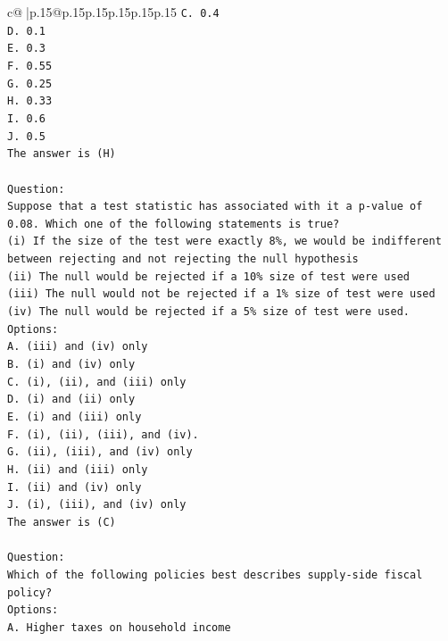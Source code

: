 \documentclass{article}
\begin{document}
{\begin{supertabular}{c@{$\;$}|p{.15\linewidth}@{}p{.15\linewidth}p{.15\linewidth}p{.15\linewidth}p{.15\linewidth}p{.15\linewidth}}
{{{\texttt{C. 0.4} \\
\texttt{D. 0.1} \\
\texttt{E. 0.3} \\
\texttt{F. 0.55} \\
\texttt{G. 0.25} \\
\texttt{H. 0.33} \\
\texttt{I. 0.6} \\
\texttt{J. 0.5} \\
\texttt{The answer is (H)} \\
\\ 
\texttt{Question:} \\
\texttt{Suppose that a test statistic has associated with it a p{-}value of 0.08. Which one of the following statements is true?} \\
\texttt{(i) If the size of the test were exactly 8\%, we would be indifferent between rejecting and not rejecting the null hypothesis} \\
\texttt{(ii) The null would be rejected if a 10\% size of test were used} \\
\texttt{(iii) The null would not be rejected if a 1\% size of test were used} \\
\texttt{(iv) The null would be rejected if a 5\% size of test were used.} \\
\texttt{Options:} \\
\texttt{A. (iii) and (iv) only} \\
\texttt{B. (i) and (iv) only} \\
\texttt{C. (i), (ii), and (iii) only} \\
\texttt{D. (i) and (ii) only} \\
\texttt{E. (i) and (iii) only} \\
\texttt{F. (i), (ii), (iii), and (iv).} \\
\texttt{G. (ii), (iii), and (iv) only} \\
\texttt{H. (ii) and (iii) only} \\
\texttt{I. (ii) and (iv) only} \\
\texttt{J. (i), (iii), and (iv) only} \\
\texttt{The answer is (C)} \\
\\ 
\texttt{Question:} \\
\texttt{Which of the following policies best describes supply{-}side fiscal policy?} \\
\texttt{Options:} \\
\texttt{A. Higher taxes on household income} \\
}}}
\end{supertabular}}
\end{document}

